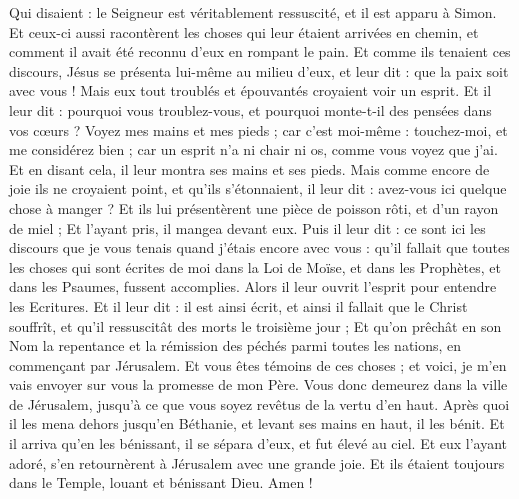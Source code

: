 \begin{multicols}{2}
Qui disaient : le Seigneur est véritablement ressuscité, et il est apparu à Simon.
Et ceux-ci aussi racontèrent les choses qui leur étaient arrivées en chemin, et comment il avait été reconnu d'eux en rompant le pain.
Et comme ils tenaient ces discours, Jésus se présenta lui-même au milieu d'eux, et leur dit : que la paix soit avec vous !
Mais eux tout troublés et épouvantés croyaient voir un esprit.
Et il leur dit : pourquoi vous troublez-vous, et pourquoi monte-t-il des pensées dans vos cœurs ?
Voyez mes mains et mes pieds ; car c'est moi-même : touchez-moi, et me considérez bien ; car un esprit n'a ni chair ni os, comme vous voyez que j'ai.
Et en disant cela, il leur montra ses mains et ses pieds.
Mais comme encore de joie ils ne croyaient point, et qu'ils s'étonnaient, il leur dit : avez-vous ici quelque chose à manger ?
Et ils lui présentèrent une pièce de poisson rôti, et d'un rayon de miel ;
Et l'ayant pris, il mangea devant eux.
Puis il leur dit : ce sont ici les discours que je vous tenais quand j'étais encore avec vous : qu'il fallait que toutes les choses qui sont écrites de moi dans la Loi de Moïse, et dans les Prophètes, et dans les Psaumes, fussent accomplies.
Alors il leur ouvrit l'esprit pour entendre les Ecritures.
Et il leur dit : il est ainsi écrit, et ainsi il fallait que le Christ souffrît, et qu'il ressuscitât des morts le troisième jour ;
Et qu'on prêchât en son Nom la repentance et la rémission des péchés parmi toutes les nations, en commençant par Jérusalem.
Et vous êtes témoins de ces choses ; et voici, je m'en vais envoyer sur vous la promesse de mon Père.
Vous donc demeurez dans la ville de Jérusalem, jusqu'à ce que vous soyez revêtus de la vertu d'en haut.
Après quoi il les mena dehors jusqu'en Béthanie, et levant ses mains en haut, il les bénit.
Et il arriva qu'en les bénissant, il se sépara d'eux, et fut élevé au ciel.
Et eux l'ayant adoré, s'en retournèrent à Jérusalem avec une grande joie.
Et ils étaient toujours dans le Temple, louant et bénissant Dieu. Amen !
\PPE{}
\end{multicols}
